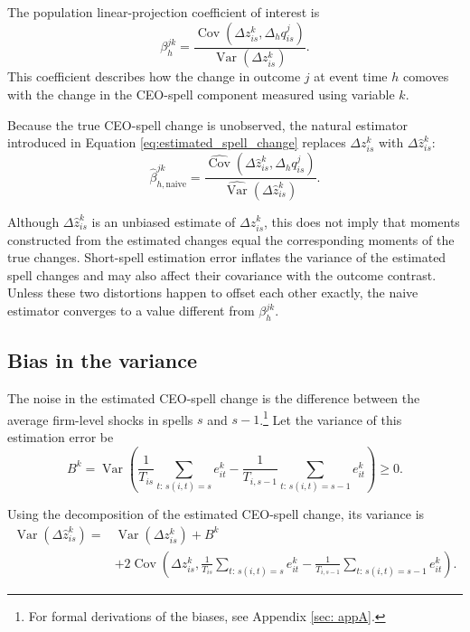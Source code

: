 \documentclass[11pt,a4paper]{article}
\begin{document}
The population linear-projection coefficient of interest is
\begin{equation}
\beta_h^{jk}
=
\frac{
\operatorname{Cov}\!\left(
\Delta z_{is}^{k},
\Delta_h q_{is}^{j}
\right)
}{
\operatorname{Var}\!\left(
\Delta z_{is}^{k}
\right)
}.
\label{eq:population_beta}
\end{equation}
This coefficient describes how the change in outcome $j$ at event time
$h$ comoves with the change in the CEO-spell component measured using
variable $k$.

Because the true CEO-spell change is unobserved, the natural estimator introduced in Equation \ref{eq:estimated_spell_change}
replaces $\Delta z_{is}^{k}$ with $\Delta\widehat z_{is}^{k}$:
\begin{equation}
\widehat\beta_{h,\mathrm{naive}}^{jk}
=
\frac{
\widehat{\operatorname{Cov}}\!\left(
\Delta\widehat z_{is}^{k},
\Delta_h q_{is}^{j}
\right)
}{
\widehat{\operatorname{Var}}\!\left(
\Delta\widehat z_{is}^{k}
\right)
}.
\label{eq:naive_beta}
\end{equation}

Although $\Delta\widehat z_{is}^{k}$ is an unbiased estimate of
$\Delta z_{is}^{k}$, this does not imply that moments constructed from
the estimated changes equal the corresponding moments of the true
changes. Short-spell estimation error inflates the variance of the
estimated spell changes and may also affect their covariance with the
outcome contrast. Unless these two distortions happen to offset each
other exactly, the naive estimator converges to a value different from
$\beta_h^{jk}$.

\subsection{Bias in the variance}
\label{subsec:variance_bias}

The noise in the estimated CEO-spell change is the difference between
the average firm-level shocks in spells $s$ and $s-1$.\footnote{For formal derivations of the biases, see Appendix \ref{sec: appA}.} Let the variance
of this estimation error be
\begin{equation}
B^{k}
=
\operatorname{Var}\!\left(
\frac{1}{T_{is}}
\sum_{t:\,s(i,t)=s} e_{it}^{k}
-
\frac{1}{T_{i,s-1}}
\sum_{t:\,s(i,t)=s-1} e_{it}^{k}
\right)
\geq 0.
\label{eq:B_definition}
\end{equation}

Using the decomposition of the estimated CEO-spell change, its variance
is
\begin{align}
\operatorname{Var}\!\left(
\Delta\widehat z_{is}^{k}
\right)
={}&
\operatorname{Var}\!\left(
\Delta z_{is}^{k}
\right)
+
B^{k}
\nonumber\\
&+
2\operatorname{Cov}\!\left(
\Delta z_{is}^{k},
\frac{1}{T_{is}}
\sum_{t:\,s(i,t)=s} e_{it}^{k}
-
\frac{1}{T_{i,s-1}}
\sum_{t:\,s(i,t)=s-1} e_{it}^{k}
\right).
\label{eq:variance_decomposition}
\end{align}
\end{document}
